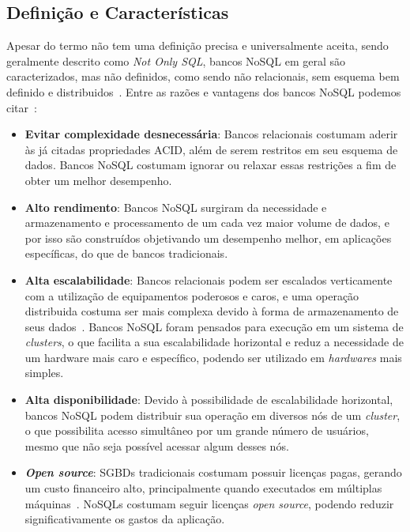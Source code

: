 \subsection{Definição e Características}
Apesar do termo não tem uma definição precisa e universalmente aceita, sendo geralmente descrito como \emph{Not Only SQL}, bancos NoSQL em geral são caracterizados, mas não definidos, como sendo não relacionais, sem esquema bem definido e distribuidos~\cite{pramod}.
	Entre as razões e vantagens dos bancos NoSQL podemos citar~\cite{chrisnosql}:
    \begin{itemize}
    \item \textbf{Evitar complexidade desnecessária}: Bancos relacionais costumam aderir às já citadas propriedades ACID, além de serem restritos em seu esquema de dados. Bancos NoSQL costumam ignorar ou relaxar essas restrições a fim de obter um melhor desempenho.
    \item \textbf{Alto rendimento}: Bancos NoSQL surgiram da necessidade e armazenamento e processamento de um cada vez maior volume de dados, e por isso são construídos objetivando um desempenho melhor, em aplicações específicas, do que de bancos tradicionais.
    \item \textbf{Alta escalabilidade}: Bancos relacionais podem ser escalados verticamente com a utilização de equipamentos poderosos e caros, e uma operação distribuida costuma ser mais complexa devido à forma de armazenamento de seus dados~\cite{leavitt2010nosql}. Bancos NoSQL foram pensados para execução em um sistema de \emph{clusters}, o que facilita a sua escalabilidade horizontal e reduz a necessidade de um hardware mais caro e específico, podendo ser utilizado em \emph{hardwares} mais simples. 
    \item \textbf{Alta disponibilidade}: Devido à possibilidade de escalabilidade horizontal, bancos NoSQL podem distribuir sua operação em diversos nós de um \emph{cluster}, o que possibilita acesso simultâneo por um grande número de usuários, mesmo que não seja possível acessar algum desses nós. 
    \item \textbf{\emph{Open source}}: SGBDs tradicionais costumam possuir licenças pagas, gerando um custo financeiro alto, principalmente quando executados em múltiplas máquinas~\cite{pramod}. NoSQLs costumam seguir licenças \emph{open source}, podendo reduzir significativamente os gastos da aplicação. 
\end{itemize}

